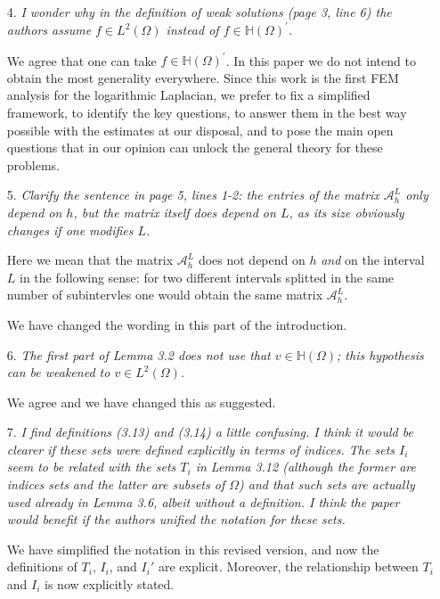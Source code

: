 \documentclass[11 pt]{article}
\numberwithin{equation}{section}
\begin{document}
\begin{enumerate}
    \item[4.] \emph{I wonder why in the definition of weak solutions (page 3, line 6) the authors assume \(f\in L^{2}(\Omega)\) instead of \(f\in\mathbb{H}(\Omega)^{\prime}\).}

    We agree that one can take \(f\in\mathbb{H}(\Omega)^{\prime}\). In this paper we do not intend to obtain the most generality everywhere. Since this work is the first FEM analysis for the logarithmic Laplacian, we prefer to fix a simplified framework, to identify the key questions, to answer them in the best way possible with the estimates at our disposal, and to pose the main open questions that in our opinion can unlock the general theory for these problems.

    \item[5.] \emph{Clarify the sentence in page 5, lines 1-2: the entries of the matrix \({\mathcal{A}}_{h}^{L}\) only depend on \(h\), but the matrix itself does depend on \(L\), as its size obviously changes if one modifies \(L\).}

    Here we mean that the matrix \({\mathcal{A}}_{h}^{L}\) does not depend on $h$ \emph{and} on the interval $L$ in the following sense: for two different intervals splitted in the same number of subintervles one would obtain the same matrix \({\mathcal{A}}_{h}^{L}\).

    We have changed the wording in this part of the introduction.

    \item[6.] \emph{The first part of Lemma 3.2 does not use that \(v\in\mathbb{H}(\Omega)\); this hypothesis can be weakened to \(v\in L^{2}(\Omega)\).}

    We agree and we have changed this as suggested.

    \item[7.] \emph{I find definitions (3.13) and (3.14) a little confusing. I think it would be clearer if these sets were defined explicitly in terms of indices. The sets \(I_{i}\) seem to be related with the sets \(T_{i}\) in Lemma 3.12 (although the former are indices sets and the latter are subsets of \(\Omega\)) and that such sets are actually used already in Lemma 3.6, albeit without a definition. I think the paper would benefit if the authors unified the notation for these sets.}

    We have simplified the notation in this revised version, and now the definitions of $T_i$, $I_i$, and $I_i'$ are explicit.  Moreover, the relationship between $T_i$ and $I_i$ is now explicitly stated.


\end{enumerate}
\end{document}
